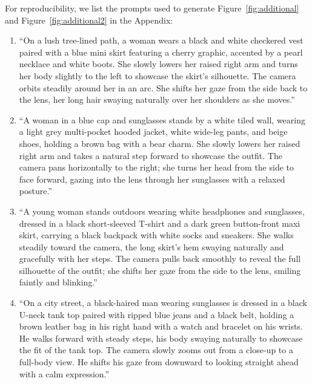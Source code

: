 For reproducibility, we list the prompts used to generate Figure~\ref{fig:additional} and Figure~\ref{fig:additional2} in the Appendix:
\begin{enumerate}
\item ``On a lush tree-lined path, a woman wears a black and white checkered vest paired with a blue mini skirt featuring a cherry graphic, accented by a pearl necklace and white boots. She slowly lowers her raised right arm and turns her body slightly to the left to showcase the skirt's silhouette. The camera orbits steadily around her in an arc. She shifts her gaze from the side back to the lens, her long hair swaying naturally over her shoulders as she moves.''
% 
\item ``A woman in a blue cap and sunglasses stands by a white tiled wall, wearing a light grey multi-pocket hooded jacket, white wide-leg pants, and beige shoes, holding a brown bag with a bear charm. She slowly lowers her raised right arm and takes a natural step forward to showcase the outfit. The camera pans horizontally to the right; she turns her head from the side to face forward, gazing into the lens through her sunglasses with a relaxed posture.''
% 
\item ``A young woman stands outdoors wearing white headphones and sunglasses, dressed in a black short-sleeved T-shirt and a dark green button-front maxi skirt, carrying a black backpack with white socks and sneakers. She walks steadily toward the camera, the long skirt's hem swaying naturally and gracefully with her steps. The camera pulls back smoothly to reveal the full silhouette of the outfit; she shifts her gaze from the side to the lens, smiling faintly and blinking.''
% 
\item ``On a city street, a black-haired man wearing sunglasses is dressed in a black U-neck tank top paired with ripped blue jeans and a black belt, holding a brown leather bag in his right hand with a watch and bracelet on his wrists. He walks forward with steady steps, his body swaying naturally to showcase the fit of the tank top. The camera slowly zooms out from a close-up to a full-body view. He shifts his gaze from downward to looking straight ahead with a calm expression.''
\end{enumerate}



